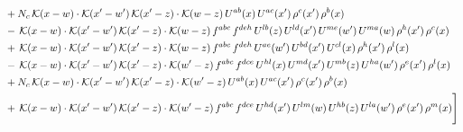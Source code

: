 \documentclass[9pt]{article}
\numberwithin{equation}{section}
\begin{document}
\begin{align}
& +N_{c}\,\mathcal{K}(x-w)\cdot\mathcal{K}(x'-w')\,\mathcal{K}(x'-z)\cdot\mathcal{K}(w-z)\,U^{ab}(x)\,U^{ac}(x')\,\rho^{c}(x')\,\rho^{b}(x)\notag\\
& -\,\mathcal{K}(x-w)\cdot\mathcal{K}(x'-w')\,\mathcal{K}(x'-z)\cdot\mathcal{K}(w-z)\,f^{abc}\,f^{deh}\,U^{lb}(z)\,U^{ld}(x')\,U^{me}(w')\,U^{ma}(w)\,\rho^{h}(x')\,\rho^{c}(x)\notag\\
& +\,\mathcal{K}(x-w)\cdot\mathcal{K}(x'-w')\,\mathcal{K}(x'-z)\cdot\mathcal{K}(w-z)\,f^{abc}\,f^{deh}\,U^{ae}(w')\,U^{bd}(x')\,U^{cl}(x)\,\rho^{h}(x')\,\rho^{l}(x)\notag\\
& -\,\mathcal{K}(x-w)\cdot\mathcal{K}(x'-w')\,\mathcal{K}(x'-z)\cdot\mathcal{K}(w'-z)\,f^{abc}\,f^{dce}\,U^{hl}(x)\,U^{md}(x')\,U^{mb}(z)\,U^{ha}(w')\,\rho^{e}(x')\,\rho^{l}(x)\notag\\
& +N_{c}\,\mathcal{K}(x-w)\cdot\mathcal{K}(x'-w')\,\mathcal{K}(x'-z)\cdot\mathcal{K}(w'-z)\,U^{ab}(x)\,U^{ac}(x')\,\rho^{c}(x')\,\rho^{b}(x)\notag\\
& +\,\mathcal{K}(x-w)\cdot\mathcal{K}(x'-w')\,\mathcal{K}(x'-z)\cdot\mathcal{K}(w'-z)\,f^{abc}\,f^{dce}\,U^{hd}(x')\,U^{lm}(w)\,U^{hb}(z)\,U^{la}(w')\,\rho^{e}(x')\,\rho^{m}(x)\Bigg]
\end{align}
\end{document}

